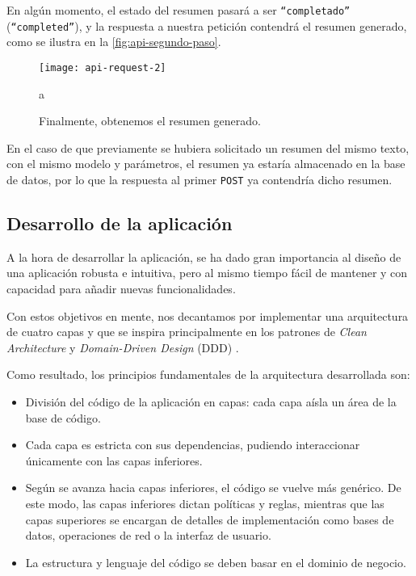 En algún momento, el estado del resumen pasará a ser \texttt{``completado''} (\texttt{``completed''}), y la respuesta a nuestra petición contendrá el resumen generado, como se ilustra en la \autoref{fig:api-segundo-paso}.

\begin{figure}[h]
	\centering
	\texttt{[image: api-request-2]}
	\caption{Finalmente, obtenemos el resumen generado.}
	\label{fig:api-segundo-paso}a
\end{figure}

En el caso de que previamente se hubiera solicitado un resumen del mismo texto, con el mismo modelo y parámetros, el resumen ya estaría almacenado en la base de datos, por lo que la respuesta al primer \texttt{POST} ya contendría dicho resumen.


\subsection{Desarrollo de la aplicación}

A la hora de desarrollar la aplicación, se ha dado gran importancia al diseño de una aplicación robusta e intuitiva, pero al mismo tiempo fácil de mantener y con capacidad para añadir nuevas funcionalidades.

Con estos objetivos en mente, nos decantamos por implementar una arquitectura de cuatro capas y que se inspira principalmente en los patrones de \emph{Clean Architecture} \cite{martin15} y \emph{Domain-Driven Design} (DDD) \cite{vernon13}.

Como resultado, los principios fundamentales de la arquitectura desarrollada son:

\begin{itemize} [\textbullet]
	\item División del código de la aplicación en capas: cada capa aísla un área de la base de código.
	
	\item Cada capa es estricta con sus dependencias, pudiendo interaccionar únicamente con las capas inferiores.
	
	\item Según se avanza hacia capas inferiores, el código se vuelve más genérico. De este modo, las capas inferiores dictan políticas y reglas, mientras que las capas superiores se encargan de detalles de implementación como bases de datos, operaciones de red o la interfaz de usuario.
	
	\item La estructura y lenguaje del código se deben basar en el dominio de negocio.
\end{itemize}

